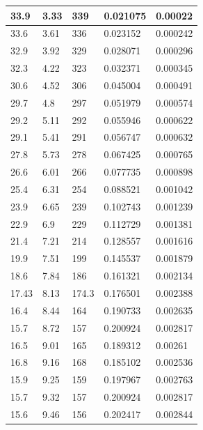 \documentclass[%
 reprint,
 amsmath,amssymb,
 aps,
]{revtex4-2}
\begin{document}
\begin{table}[h!]
\begin{tabular}{|l|l|l|l|l|}
		33.9      & 3.33     & 339       & 0.021075    & 0.00022     \\ \hline
		33.6      & 3.61     & 336       & 0.023152    & 0.000242    \\ \hline
		32.9      & 3.92     & 329       & 0.028071    & 0.000296    \\ \hline
		32.3      & 4.22     & 323       & 0.032371    & 0.000345    \\ \hline
		30.6      & 4.52     & 306       & 0.045004    & 0.000491    \\ \hline
		29.7      & 4.8      & 297       & 0.051979    & 0.000574    \\ \hline
		29.2      & 5.11     & 292       & 0.055946    & 0.000622    \\ \hline
		29.1      & 5.41     & 291       & 0.056747    & 0.000632    \\ \hline
		27.8      & 5.73     & 278       & 0.067425    & 0.000765    \\ \hline
		26.6      & 6.01     & 266       & 0.077735    & 0.000898    \\ \hline
		25.4      & 6.31     & 254       & 0.088521    & 0.001042    \\ \hline
		23.9      & 6.65     & 239       & 0.102743    & 0.001239    \\ \hline
		22.9      & 6.9      & 229       & 0.112729    & 0.001381    \\ \hline
		21.4      & 7.21     & 214       & 0.128557    & 0.001616    \\ \hline
		19.9      & 7.51     & 199       & 0.145537    & 0.001879    \\ \hline
		18.6      & 7.84     & 186       & 0.161321    & 0.002134    \\ \hline
		17.43     & 8.13     & 174.3     & 0.176501    & 0.002388    \\ \hline
		16.4      & 8.44     & 164       & 0.190733    & 0.002635    \\ \hline
		15.7      & 8.72     & 157       & 0.200924    & 0.002817    \\ \hline
		16.5      & 9.01     & 165       & 0.189312    & 0.00261     \\ \hline
		16.8      & 9.16     & 168       & 0.185102    & 0.002536    \\ \hline
		15.9      & 9.25     & 159       & 0.197967    & 0.002763    \\ \hline
		15.7      & 9.32     & 157       & 0.200924    & 0.002817    \\ \hline
		15.6      & 9.46     & 156       & 0.202417    & 0.002844    \\ \hline

\end{tabular}
\end{table}
\end{document}
